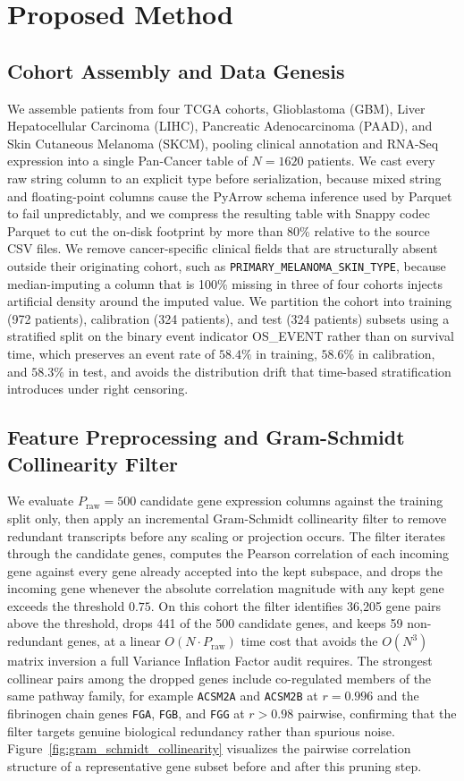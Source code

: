 \documentclass[10pt,a4paper]{article}
\begin{document}
\section{Proposed Method}

\subsection{Cohort Assembly and Data Genesis}
We assemble patients from four TCGA cohorts, Glioblastoma (GBM), Liver Hepatocellular Carcinoma (LIHC), Pancreatic Adenocarcinoma (PAAD), and Skin Cutaneous Melanoma (SKCM), pooling clinical annotation and RNA-Seq expression into a single Pan-Cancer table of $N = 1620$ patients. We cast every raw string column to an explicit type before serialization, because mixed string and floating-point columns cause the PyArrow schema inference used by Parquet to fail unpredictably, and we compress the resulting table with Snappy codec Parquet to cut the on-disk footprint by more than 80\% relative to the source CSV files. We remove cancer-specific clinical fields that are structurally absent outside their originating cohort, such as \texttt{PRIMARY\_MELANOMA\_SKIN\_TYPE}, because median-imputing a column that is 100\% missing in three of four cohorts injects artificial density around the imputed value. We partition the cohort into training (972 patients), calibration (324 patients), and test (324 patients) subsets using a stratified split on the binary event indicator OS\_EVENT rather than on survival time, which preserves an event rate of $58.4\%$ in training, $58.6\%$ in calibration, and $58.3\%$ in test, and avoids the distribution drift that time-based stratification introduces under right censoring.

\subsection{Feature Preprocessing and Gram-Schmidt Collinearity Filter}
We evaluate $P_{\text{raw}} = 500$ candidate gene expression columns against the training split only, then apply an incremental Gram-Schmidt collinearity filter to remove redundant transcripts before any scaling or projection occurs. The filter iterates through the candidate genes, computes the Pearson correlation of each incoming gene against every gene already accepted into the kept subspace, and drops the incoming gene whenever the absolute correlation magnitude with any kept gene exceeds the threshold $0.75$. On this cohort the filter identifies 36,205 gene pairs above the threshold, drops 441 of the 500 candidate genes, and keeps 59 non-redundant genes, at a linear $O(N \cdot P_{\text{raw}})$ time cost that avoids the $O(N^3)$ matrix inversion a full Variance Inflation Factor audit requires. The strongest collinear pairs among the dropped genes include co-regulated members of the same pathway family, for example \texttt{ACSM2A} and \texttt{ACSM2B} at $r = 0.996$ and the fibrinogen chain genes \texttt{FGA}, \texttt{FGB}, and \texttt{FGG} at $r > 0.98$ pairwise, confirming that the filter targets genuine biological redundancy rather than spurious noise. Figure~\ref{fig:gram_schmidt_collinearity} visualizes the pairwise correlation structure of a representative gene subset before and after this pruning step.
\end{document}
